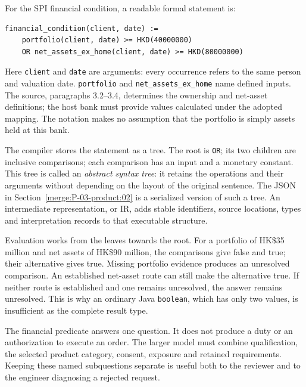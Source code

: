 For the SPI financial condition, a readable formal statement is:
\begin{lstlisting}[caption={Illustrative controlled syntax for Annex 1 paragraph 3.1. This is a teaching notation, not Catala or Stipula source.}]
financial_condition(client, date) :=
    portfolio(client, date) >= HKD(40000000)
    OR net_assets_ex_home(client, date) >= HKD(80000000)
\end{lstlisting}
Here \texttt{client} and \texttt{date} are arguments: every occurrence refers to
the same person and valuation date. \texttt{portfolio} and
\texttt{net\_assets\_ex\_home} name defined inputs. The source, paragraphs
3.2--3.4, determines the ownership and net-asset definitions; the host bank must
provide values calculated under the adopted mapping. The notation makes no
assumption that the portfolio is simply assets held at this bank.


The compiler stores the statement as a tree. The root is \texttt{OR}; its two
children are inclusive comparisons; each comparison has an input and a monetary
constant. This tree is called an \emph{abstract syntax tree}: it retains the
operations and their arguments without depending on the layout of the original
sentence. The JSON in Section~\ref{merge:P-03-product:02} is a serialized version of such
a tree. An intermediate representation, or IR, adds stable identifiers, source
locations, types and interpretation records to that executable structure.

Evaluation works from the leaves towards the root. For a portfolio of HK\$35
million and net assets of HK\$90 million, the comparisons give false and true;
their alternative gives true. Missing portfolio evidence produces an unresolved
comparison. An established net-asset route can still make the alternative true.
If neither route is established and one remains unresolved, the answer remains
unresolved. This is why an ordinary Java \texttt{boolean}, which has only two
values, is insufficient as the complete result type.

The financial predicate answers one question. It does not produce a duty or an
authorization to execute an order. The larger model must combine qualification,
the selected product category, consent, exposure and retained requirements.
Keeping these named subquestions separate is useful both to the reviewer and
to the engineer diagnosing a rejected request.

